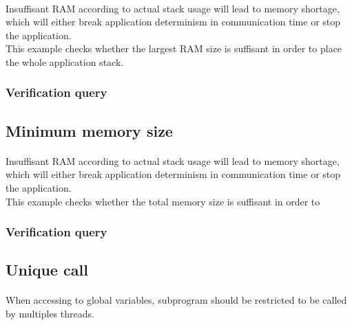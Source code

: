 \paragraph{}
Insuffisant RAM according to actual stack usage will 
lead to memory shortage, which will either break 
application determinism in communication time or stop 
the application.\\
This example checks whether the largest RAM size is 
suffisant in order to place the whole application stack.

\subsubsection {Verification query}
\paragraph{}


\subsection {Minimum memory size}

\paragraph{}
Insuffisant RAM according to actual stack usage will 
lead to memory shortage, which will either break 
application determinism in communication time or stop 
the application.\\
This example checks whether the total memory size is 
suffisant in order to 

\subsubsection {Verification query}
\paragraph{}


\subsection {Unique call}

\paragraph{}
When accessing to global variables, subprogram should be restricted to be called by
multiples threads.

